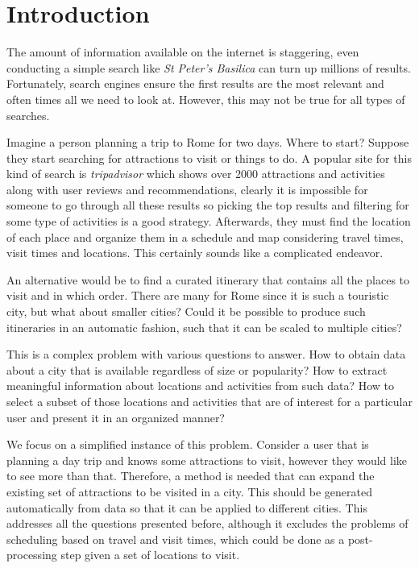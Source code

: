 \chapter{Introduction}
\label{sec:introduction}

The amount of information available on the internet is staggering, even conducting a simple search like \textit{St Peter's Basilica} can turn up millions of results. Fortunately, search engines ensure the first results are the most relevant and often times all we need to look at. However, this may not be true for all types of searches.

Imagine a person planning a trip to Rome for two days. Where to start? Suppose they start searching for attractions to visit or things to do. A popular site for this kind of search is \textit{tripadvisor} which shows over 2000 attractions and activities along with user reviews and recommendations, clearly it is impossible for someone to go through all these results so picking the top results and filtering for some type of activities is a good strategy. Afterwards, they must find the location of each place and organize them in a schedule and map considering travel times, visit times and locations. This certainly sounds like a complicated endeavor.

An alternative would be to find a curated itinerary that contains all the places to visit and in which order. There are many for Rome since it is such a touristic city, but what about smaller cities? Could it be possible to produce such itineraries in an automatic fashion, such that it can be scaled to multiple cities?

This is a complex problem with various questions to answer. How to obtain data about a city that is available regardless of size or popularity? How to extract meaningful information about locations and activities from such data? How to select a subset of those locations and activities that are of interest for a particular user and present it in an organized manner?

We focus on a simplified instance of this problem. Consider a user that is planning a day trip and knows some attractions to visit, however they would like to see more than that. Therefore, a method is needed that can expand the existing set of attractions to be visited in a city. This should be generated automatically from data so that it can be applied to different cities. This addresses all the questions presented before, although it excludes the problems of scheduling based on travel and visit times, which could be done as a post-processing step given a set of locations to visit.

